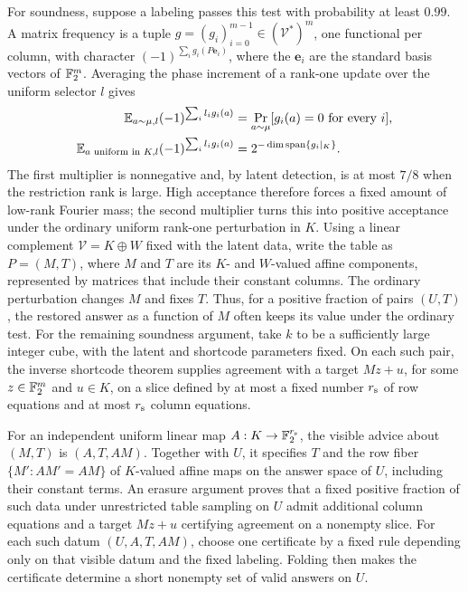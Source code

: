 For soundness, suppose a labeling passes this test with probability at
least \(0.99\). A matrix frequency is a tuple
\(g=(g_i)_{i=0}^{m-1}\in(\mathcal V^*)^m\), one functional per column,
with character \((-1)^{\sum_i g_i(P\mathbf e_i)}\), where the
\(\mathbf e_i\) are the standard basis vectors of \(\mathbb F_2^m\). Averaging the phase increment of a
rank-one update over the uniform selector \(l\) gives
\[
\begin{aligned}
 \mathbb E_{a\sim\mu,l}(-1)^{\sum_i l_i g_i(a)}
   &=\Pr_{a\sim\mu}[g_i(a)=0\text{ for every }i],\\
 \mathbb E_{a\text{ uniform in }K,l}(-1)^{\sum_i l_i g_i(a)}
   &=2^{-\dim\operatorname{span}\{g_i|_K\}}.
\end{aligned}
\]
The first multiplier is nonnegative and, by latent detection, is at most
\(7/8\) when the restriction rank is large. High acceptance therefore
forces a fixed amount of low-rank Fourier mass; the second multiplier
turns this into positive acceptance under the ordinary uniform rank-one
perturbation in \(K\). Using a linear complement
\(\mathcal V=K\oplus W\) fixed with the latent data, write the table as
\(P=(M,T)\), where \(M\) and \(T\) are its \(K\)- and \(W\)-valued
affine components, represented by matrices that include their constant
columns. The ordinary perturbation changes \(M\) and
fixes \(T\). Thus, for a positive fraction of pairs \((U,T)\), the
restored answer as a function of \(M\) often keeps its value under the
ordinary test. For the remaining soundness argument, take \(k\) to be a
sufficiently large integer cube, with the latent and shortcode parameters
fixed. On each such pair, the inverse shortcode theorem supplies
agreement with a target \(Mz+u\), for some \(z\in\mathbb F_2^m\) and \(u\in K\),
on a slice defined by at most a fixed number \(r_{\rm s}\) of row equations
and at most \(r_{\rm s}\) column equations.

For an independent uniform linear map \(A:K\to\mathbb F_2^{r_{\rm s}}\), the
visible advice about \((M,T)\) is \((A,T,AM)\). Together with \(U\), it
specifies \(T\) and the row fiber \(\{M':AM'=AM\}\) of \(K\)-valued affine
maps on the answer space of \(U\), including their constant terms. An erasure argument
proves that a fixed positive fraction of such data under unrestricted
table sampling on \(U\) admit additional column equations and a target
\(Mz+u\) certifying agreement on a nonempty slice. For each such datum
\((U,A,T,AM)\),
choose one certificate by a fixed rule depending only on that visible datum
and the fixed labeling. Folding then makes the certificate determine a short
nonempty set of valid answers on \(U\).

